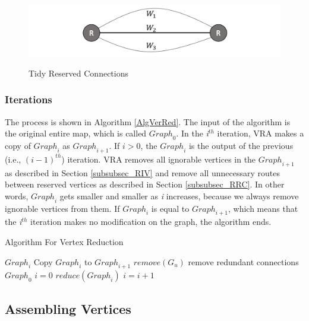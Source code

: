 \begin{figure} [hbtp]
  \centering 
  \includegraphics[height=1.2in]{figures/F52TidyReservedConnections.png}
  \caption{Tidy Reserved Connections} 
  \label{fig:F52TidyReservedConnections} %
\end{figure}

\subsubsection{ Iterations}

The process is shown in Algorithm \ref{AlgVerRed}. The input of the algorithm is the original entire map, which is called ${Graph}_0$. In the \textit{i}${}^{th}$ iteration, VRA makes a copy of ${Graph}_i$ as ${Graph}_{i+1}$. If $i>0$, the ${Graph}_i$ is the output of the previous (i.e., ${\left(i-1\right)}^{th}$) iteration. VRA removes all ignorable vertices in the ${Graph}_{i+1}$ as described in Section \ref{subsubsec_RIV} and remove all unnecessary routes between reserved vertices as described in Section \ref{subsubsec_RRC}. In other words, ${Graph}_i$ gets smaller and smaller as \textit{i} increases, because we always remove ignorable vertices from them. If ${Graph}_i$ is equal to ${Graph}_{i+1}$, which means that the \textit{i}${}^{th}$ iteration makes no modification on the graph, the algorithm ends.

\begin{algorithm} [hbtp]
\caption{Algorithm For Vertex Reduction}\label{AlgVerRed}
\begin{algorithmic}[1]
 {${Graph}_i$}
\State Copy ${Graph}_i$ to ${Graph}_{i+1}$
	\State $remove(G_u)$
\EndFor
{}
	\State remove redundant connections
\EndFor
\EndProcedure
{} {${Graph}_0$}
\State $i=0$
	\State $reduce({Graph}_i)$
	\State $i=i+1$
\EndWhile
\EndProcedure
\end{algorithmic}
\end{algorithm}

\subsection{ Assembling Vertices}\label{subsecAssVer}

